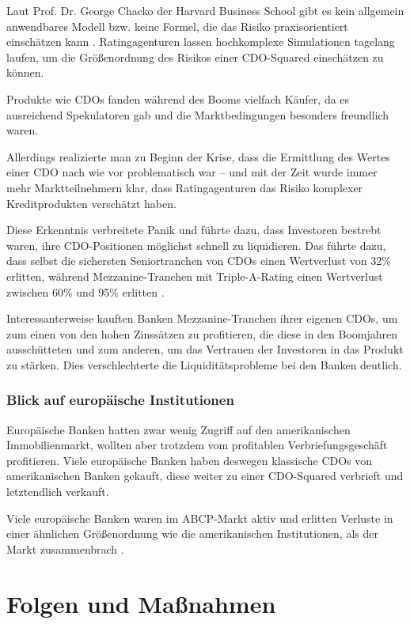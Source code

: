 \documentclass[a4paper,11pt]{report}
\begin{document}
Laut Prof. Dr. George Chacko der Harvard Business School gibt es kein
allgemein anwendbares Modell bzw. keine Formel,
die das Risiko praxisorientiert einsch\"atzen kann
\parencite[226]{chackocred}. Ratingagenturen lassen
hochkomplexe Simulationen tagelang laufen, um die
Gr\"oßenordnung des Risikos einer CDO-Squared
einsch\"atzen zu k\"onnen.

Produkte wie CDOs fanden w\"ahrend des Booms vielfach K\"aufer, da  
es ausreichend Spekulatoren gab und die Marktbedingungen besonders
freundlich waren.

Allerdings realizierte man zu Beginn der Krise, dass die Ermittlung des Wertes
einer CDO nach wie vor problematisch war -- und mit der Zeit wurde immer mehr
Marktteilnehmern klar, dass Ratingagenturen das Risiko
komplexer Kreditprodukten versch\"atzt haben.

Diese Erkenntnis verbreitete Panik und f\"uhrte dazu, 
dass Investoren bestrebt waren, ihre CDO-Positionen
m\"oglichst schnell zu liquidieren.
Das f\"uhrte dazu, dass selbst die sichersten
Seniortranchen von CDOs einen Wertverlust von 32\% erlitten, w\"ahrend Mezzanine-Tranchen mit
Triple-A-Rating einen Wertverlust zwischen 60\% und 95\% erlitten \parencite[567]{crottycam}.

Interessanterweise kauften Banken Mezzanine-Tranchen ihrer eigenen CDOs,
um zum einen von den hohen Zinss\"atzen zu profitieren, die
diese in den Boomjahren aussch\"utteten und zum anderen, um das Vertrauen der
Investoren in das Produkt zu st\"arken. Dies verschlechterte die Liquidit\"atsprobleme
bei den Banken deutlich.

\subsection{Blick auf europ\"aische Institutionen}
Europ\"aische Banken hatten zwar wenig Zugriff auf
den amerikanischen Immobilienmarkt,
wollten aber trotzdem vom profitablen Verbriefungsgesch\"aft profitieren.
Viele europäische Banken haben deswegen klassische CDOs von amerikanischen
Banken gekauft, diese weiter zu einer CDO-Squared verbrieft und letztendlich
verkauft.

Viele europäische Banken waren im ABCP-Markt aktiv und erlitten
Verluste in einer \"ahnlichen Gr\"oßenordnung
wie die amerikanischen Institutionen, als der Markt 
zusammenbrach \parencite[26--28]{iwregulation}.

\chapter{Folgen und Maßnahmen}
\end{document}
